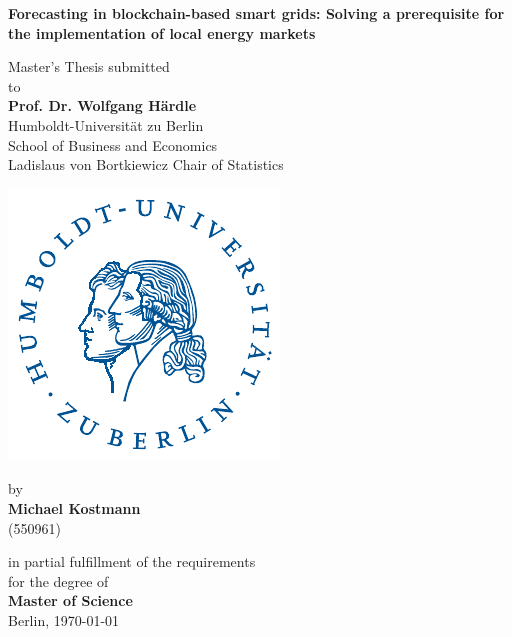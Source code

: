 \begin{center}

    {\Large{\bf Forecasting in blockchain-based smart grids: Solving a prerequisite for the implementation of local energy markets}} \vspace{1cm}


    {\normalsize Master's Thesis submitted\\\vspace{0.5cm}
    to}\\\vspace{0.5cm}
    {\normalsize{\bf Prof. Dr. Wolfgang H\"ardle}} \\\vspace{0.5cm}
    {\normalsize Humboldt-Universit\"at zu Berlin \\
    School of Business and Economics \\
    Ladislaus von Bortkiewicz Chair of Statistics} \vspace{1cm}
    
    \includegraphics[]{thesis/figures/logo.pdf}
    \vspace{1cm}

    {\normalsize by \\\vspace{0.5cm}
    {\bf Michael Kostmann} \\
    (550961)} \vspace{1cm}


    {\normalsize in partial fulfillment of the requirements \\
    for the degree of \\
    {\bf Master of Science} \\\vspace{1cm}
    Berlin, \today}

\end{center}
